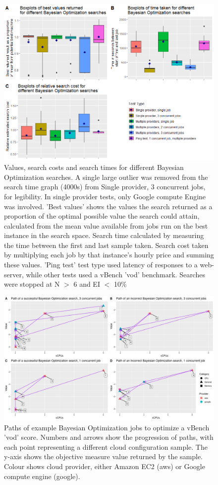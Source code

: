 \documentclass{report}
\begin{document}
\begin{figure}
  \caption{Values, search costs and search times for different Bayesian Optimization searches. A single large outlier was removed from the search time graph (4000s) from Single provider, 3 concurrent jobs, for legibility. In single provider tests, only Google compute Engine was involved. 'Best values' shows the values the search returned as a proportion of the optimal possible value the search could attain, calculated from the mean value available from jobs run on the best instance in the search space. Search time calculated by measuring the time between the first and last sample taken. Search cost taken by multiplying each job by that instance's hourly price and summing these values. 'Ping test' test type used latency of responses to a web-server, while other tests used a vBench 'vod' benchmark. Searches were stopped at N $>$ 6 and EI $<$ 10\%}
  \label{fig:bo-boxplots}
  \centering
  \includegraphics[scale=0.7]{bo_boxplots}
\end{figure}
\begin{figure}
	\centering
	\includegraphics[scale=0.4]{paths}
	\caption{Paths of example Bayesian Optimization jobs to optimize a vBench 'vod' score. Numbers and arrows show the progression of paths, with each point representing a different cloud configuration sample. The y-axis shows the objective measure value returned by the sample. Colour shows cloud provider, either Amazon EC2 (aws) or Google compute engine (google).}
	\label{fig:paths}
\end{figure}
\end{document}
